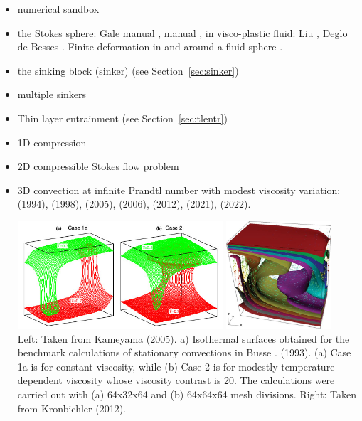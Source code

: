 \begin{itemize}
\item numerical sandbox \cite{bube06,bube06,maie12,busa16,gltf18}
\item the Stokes sphere: Gale manual \cite{galemanual}, \aspect{} manual \cite{aspectmanual}, 
                         in visco-plastic fluid: Liu \etal \cite{limd02}, Deglo de Besses \etal \cite{demj04}. 
      Finite deformation in and around a fluid sphere \cite{sccm88,crud88}.
\item the sinking block (sinker) \cite{thie11,cehg14,gery10,geyu03,mamo08,mishin11,fumt11,maie12,sctc20} 
      (see Section~\ref{sec:sinker})
\item multiple sinkers \cite{mabl14,mabl15,clhe21}
\item Thin layer entrainment (see Section~\ref{sec:tlentr})
\item 1D compression \cite{modm02}
\item 2D compressible Stokes flow problem \cite{itki94,tagu07,lezh08,kilv10,lizh13}
\item 3D convection at infinite Prandtl number with modest viscosity variation:
      \textcite{bucc94} (1994),
      \textcite{trha98} (1998),
      \textcite{kaks05} (2005),
      \textcite{onmm06} (2006),
      \textcite{krhb12} (2012), 
      \textcite{trbs21} (2021),
      \textcite{dakg22} (2022).

      \begin{center}
      \includegraphics[height=4cm]{images/busse93/kaks05}
      \includegraphics[height=4cm]{images/busse93/krhb12}\\
      {\captionfont Left: Taken from Kameyama \etal (2005).
      a) Isothermal surfaces obtained for the benchmark calculations 
      of stationary convections in Busse \etal. (1993). (a) Case 1a is for
      constant viscosity, while (b) Case 2 is for modestly temperature-dependent 
      viscosity whose viscosity contrast is 20. The calculations
      were carried out with (a) 64x32x64 and (b) 64x64x64 mesh divisions.
      Right: Taken from Kronbichler \etal (2012).}
      \end{center}


\end{itemize}
